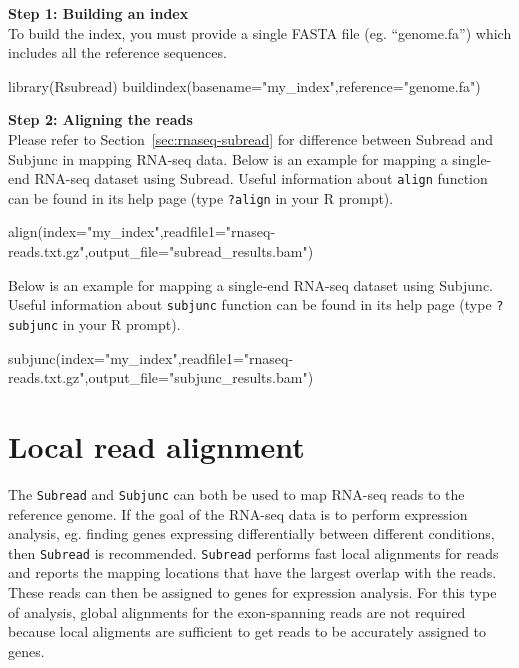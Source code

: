 \documentclass[12pt]{report}
\newcommand{\code}[1]{{\small\texttt{#1}}}
\newcommand{\Subread}{\textsf{Subread}}
\newcommand{\Subjunc}{\textsf{Subjunc}}
\newcommand{\R}{\textsf{R}}
\begin{document}
{\noindent\bf Step 1: Building an index}\\

\noindent To build the index, you must provide a single FASTA file (eg. ``genome.fa'') which includes all the reference sequences.

\begin{Rcode}
library(Rsubread)
buildindex(basename="my_index",reference="genome.fa")
\end{Rcode}

{\noindent\bf Step 2: Aligning the reads}\\

Please refer to Section~\ref{sec:rnaseq-subread} for difference between {\Subread} and {\Subjunc} in mapping RNA-seq data.
Below is an example for mapping a single-end RNA-seq dataset using {\Subread}.
Useful information about \code{align} function can be found in its help page (type \code{?align} in your {\R} prompt).

\begin{Rcode}
align(index="my_index",readfile1="rnaseq-reads.txt.gz",output_file="subread_results.bam")
\end{Rcode}

Below is an example for mapping a single-end RNA-seq dataset using {\Subjunc}.
Useful information about \code{subjunc} function can be found in its help page (type \code{?subjunc} in your {\R} prompt).

\begin{Rcode}
subjunc(index="my_index",readfile1="rnaseq-reads.txt.gz",output_file="subjunc_results.bam")
\end{Rcode}


\section{Local read alignment}

The \code{Subread} and \code{Subjunc} can both be used to map RNA-seq reads to the reference genome.
If the goal of the RNA-seq data is to perform expression analysis, eg. finding genes expressing differentially between different conditions, then \code{Subread} is recommended.
\code{Subread} performs fast local alignments for reads and reports the mapping locations that have the largest overlap with the reads.
These reads can then be assigned to genes for expression analysis.
For this type of analysis, global alignments for the exon-spanning reads are not required because local aligments are sufficient to get reads to be accurately assigned to genes.
\end{document}
